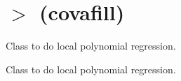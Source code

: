 \hypertarget{group__Core}{}\section{$>$ (covafill)}
\label{group__Core}


Class to do local polynomial regression.  


Class to do local polynomial regression. 

